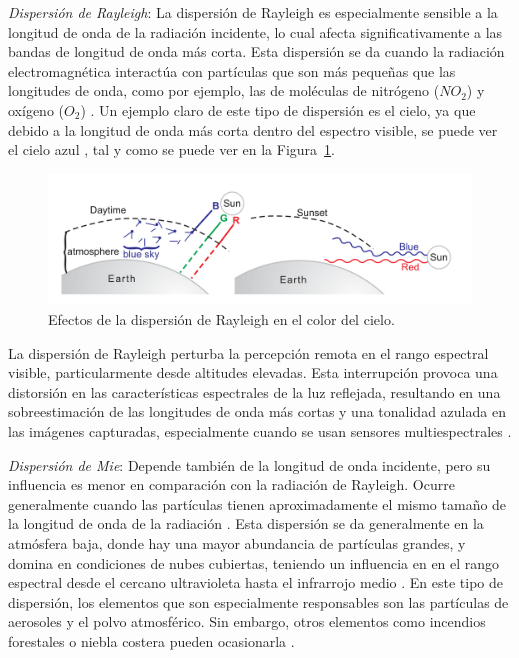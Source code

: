 \textit{Dispersión de Rayleigh}: La dispersión de Rayleigh es especialmente sensible a la longitud de onda de la radiación incidente, lo cual afecta significativamente a las bandas de longitud de onda más corta. Esta dispersión se da cuando la radiación electromagnética interactúa con partículas que son más pequeñas que las longitudes de onda, como por ejemplo, las de moléculas de nitrógeno ($NO_{2}$) y oxígeno ($O_{2}$) \cite{tempfli2009principles, chuvieco2016fundamentals}. Un ejemplo claro de este tipo de dispersión es el cielo, ya que debido a la longitud de onda más corta dentro del espectro visible, se puede ver el cielo azul \cite{canada2007fundamentals}, tal y como se puede ver en la Figura~\ref{fig:DispersionRayleigh}.

\begin{figure}[H]
    \begin{center}
        \includegraphics[width=1\textwidth]{Images/DispersionRayleigh.png}
    \end{center}
    \caption{Efectos de la dispersión de Rayleigh en el color del cielo.}
    \label{fig:DispersionRayleigh}
\end{figure}

La dispersión de Rayleigh perturba la percepción remota en el rango espectral visible, particularmente desde altitudes elevadas. Esta interrupción provoca una distorsión en las características espectrales de la luz reflejada, resultando en una sobreestimación de las longitudes de onda más cortas y una tonalidad azulada en las imágenes capturadas, especialmente cuando se usan sensores multiespectrales \cite{tempfli2009principles}.

\textit{Dispersión de Mie}: Depende también de la longitud de onda incidente, pero su influencia es menor en comparación con la radiación de Rayleigh. Ocurre generalmente cuando las partículas tienen aproximadamente el mismo tamaño de la longitud de onda de la radiación \cite{canada2007fundamentals}. Esta dispersión se da generalmente en la atmósfera baja, donde hay una mayor abundancia de partículas grandes, y domina en condiciones de nubes cubiertas, teniendo un influencia en en el rango espectral desde el cercano ultravioleta hasta el infrarrojo medio \cite{tempfli2009principles}. En este tipo de dispersión, los elementos que son especialmente responsables son las partículas de aerosoles y el polvo atmosférico. Sin embargo, otros elementos como incendios forestales o niebla costera pueden ocasionarla \cite{chuvieco2016fundamentals}.

